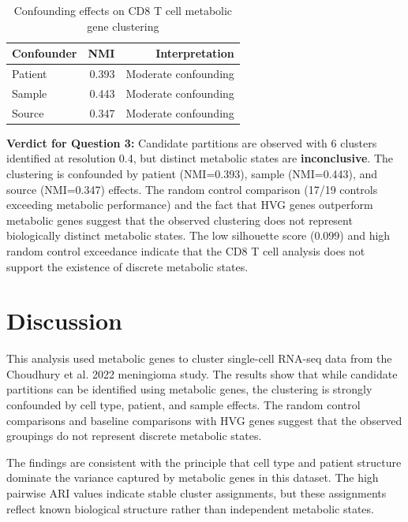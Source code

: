 \documentclass[11pt, a4paper]{article}
\begin{document}
\begin{table}[h!]
\centering
\caption{Confounding effects on CD8 T cell metabolic gene clustering}
\label{tab:cd8_confounders}
\begin{tabular}{lrr}
\toprule
Confounder & NMI & Interpretation \\
\midrule
Patient & 0.393 & Moderate confounding \\
Sample & 0.443 & Moderate confounding \\
Source & 0.347 & Moderate confounding \\
\bottomrule
\end{tabular}
\end{table}

\textbf{Verdict for Question 3:} Candidate partitions are observed with 6 clusters identified at resolution 0.4, but distinct metabolic states are \textbf{inconclusive}. The clustering is confounded by patient (NMI=0.393), sample (NMI=0.443), and source (NMI=0.347) effects. The random control comparison (17/19 controls exceeding metabolic performance) and the fact that HVG genes outperform metabolic genes suggest that the observed clustering does not represent biologically distinct metabolic states. The low silhouette score (0.099) and high random control exceedance indicate that the CD8 T cell analysis does not support the existence of discrete metabolic states.

\section{Discussion}
This analysis used metabolic genes to cluster single-cell RNA-seq data from the Choudhury et al. 2022 meningioma study. The results show that while candidate partitions can be identified using metabolic genes, the clustering is strongly confounded by cell type, patient, and sample effects. The random control comparisons and baseline comparisons with HVG genes suggest that the observed groupings do not represent discrete metabolic states.

The findings are consistent with the principle that cell type and patient structure dominate the variance captured by metabolic genes in this dataset. The high pairwise ARI values indicate stable cluster assignments, but these assignments reflect known biological structure rather than independent metabolic states.
\end{document}
